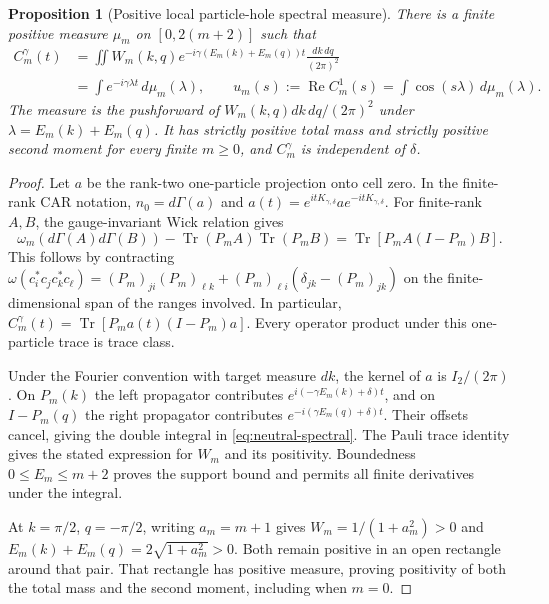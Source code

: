 \documentclass[11pt]{article}
\newtheorem{proposition}[theorem]{Proposition}
\theoremstyle{definition}
\begin{document}
\begin{proposition}[Positive local particle-hole spectral measure]
\label{prop:neutral-spectral}
There is a finite positive measure $\mu_m$ on $[0,2(m+2)]$ such that
\begin{equation}
 \begin{split}
 C_m^\gamma(t)
 &=\iint W_m(k,q)e^{-i\gamma(E_m(k)+E_m(q))t}
                    \frac{dk\,dq}{(2\pi)^2}\\
 &=\int e^{-i\gamma\lambda t}\,d\mu_m(\lambda),
 \qquad u_m(s):=\operatorname{Re}C_m^1(s)
              =\int\cos(s\lambda)\,d\mu_m(\lambda).
 \end{split}
 \label{eq:neutral-spectral}
\end{equation}
The measure is the pushforward of
$W_m(k,q)dk\,dq/(2\pi)^2$ under $\lambda=E_m(k)+E_m(q)$.
It has strictly positive total mass and strictly positive second moment
for every finite $m\ge0$, and $C_m^\gamma$ is independent of $\delta$.
\end{proposition}
\begin{proof}
Let $a$ be the rank-two one-particle projection onto cell zero. In the
finite-rank CAR notation, $n_0=d\Gamma(a)$ and
$a(t)=e^{itK_{\gamma,\delta}}ae^{-itK_{\gamma,\delta}}$.
For finite-rank $A,B$, the gauge-invariant Wick relation gives
\[
 \omega_m(d\Gamma(A)d\Gamma(B))
   -\operatorname{Tr}(P_m A)\operatorname{Tr}(P_m B)
   =\operatorname{Tr}[P_m A(I-P_m)B].
\]
This follows by contracting
$\omega(c_i^*c_jc_k^*c_\ell)
 =(P_m)_{ji}(P_m)_{\ell k}
  +(P_m)_{\ell i}(\delta_{jk}-(P_m)_{jk})$ on the finite-dimensional
span of the ranges involved. In particular,
$C_m^\gamma(t)=\operatorname{Tr}[P_m a(t)(I-P_m)a]$.
Every operator product under this one-particle trace is trace class.

Under the Fourier convention with target measure $dk$, the kernel of $a$
is $I_2/(2\pi)$. On $P_m(k)$ the left propagator contributes
$e^{i(-\gamma E_m(k)+\delta)t}$, and on $I-P_m(q)$ the right propagator
contributes $e^{-i(\gamma E_m(q)+\delta)t}$. Their offsets cancel, giving
the double integral in \eqref{eq:neutral-spectral}. The Pauli trace identity
gives the stated expression for $W_m$ and its positivity. Boundedness
$0\le E_m\le m+2$ proves the support bound and permits all finite
derivatives under the integral.

At $k=\pi/2$, $q=-\pi/2$, writing $a_m=m+1$ gives
$W_m=1/(1+a_m^2)>0$ and $E_m(k)+E_m(q)=2\sqrt{1+a_m^2}>0$.
Both remain positive in an open rectangle around that pair. That rectangle
has positive measure, proving positivity of both the total mass and the
second moment, including when $m=0$.
\end{proof}
\end{document}
